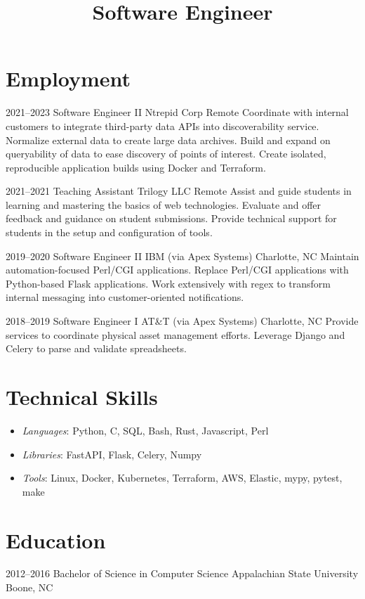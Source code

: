 \documentclass[11pt,a4paper,sans]{moderncv}
\title{\color{black}Software Engineer}
\begin{document}
\maketitle

\section{Employment}

\cventry
    {2021--2023}
    {Software Engineer II}
    {Ntrepid Corp}
    {Remote}
    {}
    {Coordinate with internal customers to integrate third-party data APIs into discoverability service.\newline{}
     Normalize external data to create large data archives.\newline{}
     Build and expand on queryability of data to ease discovery of points of interest.\newline{}
     Create isolated, reproducible application builds using Docker and Terraform.}

\cventry
    {2021--2021}
    {Teaching Assistant}
    {Trilogy LLC}
    {Remote}
    {}
    {Assist and guide students in learning and mastering the basics of web technologies.\newline{}
     Evaluate and offer feedback and guidance on student submissions.\newline{}
     Provide technical support for students in the setup and configuration of tools.}

\cventry
    {2019--2020}
    {Software Engineer II}
    {IBM (via Apex Systems)}
    {Charlotte, NC}
    {}
    {Maintain automation-focused Perl/CGI applications.\newline{}
     Replace Perl/CGI applications with Python-based Flask applications.\newline{}
     Work extensively with regex to transform internal messaging into customer-oriented notifications.}

\cventry
    {2018--2019}
    {Software Engineer I}
    {AT\&T (via Apex Systems)}
    {Charlotte, NC}
    {}
    {Provide services to coordinate physical asset management efforts.\newline{}
     Leverage Django and Celery to parse and validate spreadsheets.}

\section{Technical Skills}
\begin{itemize}
\itemindent.6in
    \item \emph{Languages}: Python, C, SQL, Bash, Rust, Javascript, Perl
    \item \emph{Libraries}: FastAPI, Flask, Celery, Numpy
    \item \emph{Tools}: Linux, Docker, Kubernetes, Terraform, AWS, Elastic, mypy, pytest, make
\end{itemize}

\section{Education}
\cventry
    {2012--2016}
    {Bachelor of Science in Computer Science}
    {Appalachian State University}
    {Boone, NC}
    {}
    {}
\end{document}

